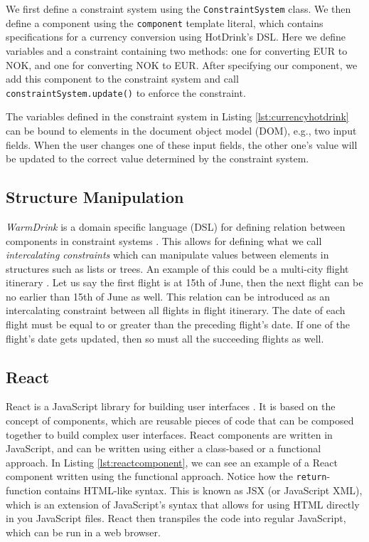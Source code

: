 \documentclass[11pt, a4paper]{article}
\begin{document}
We first define a constraint system using the \texttt{ConstraintSystem} class. We then define a component using the \texttt{component} template literal, which contains specifications for a currency conversion using HotDrink's DSL. Here we define variables and a constraint containing two methods: one for converting EUR to NOK, and one for converting NOK to EUR. After specifying our component, we add this component to the constraint system and call \texttt{constraintSystem.update()} to enforce the constraint.

The variables defined in the constraint system in Listing \ref{lst:currencyhotdrink} can be bound to elements in the document object model (DOM), e.g., two input fields. When the user changes one of these input fields, the other one's value will be updated to the correct value determined by the constraint system.

\subsection{Structure Manipulation}
\label{sec:structuremanipulation}
\textit{WarmDrink} is a domain specific language (DSL) for defining relation between components in constraint systems \cite{warmdrink}. This allows for defining what we call \textit{intercalating constraints} which can manipulate values between elements in structures such as lists or trees. An example of this could be a multi-city flight itinerary \cite{warmdrink}. Let us say the first flight is at 15th of June, then the next flight can be no earlier than 15th of June as well. This relation can be introduced as an intercalating constraint between all flights in flight itinerary. The date of each flight must be equal to or greater than the preceding flight's date. If one of the flight's date gets updated, then so must all the succeeding flights as well.

\subsection{React}
\label{sec:react}
React is a JavaScript library for building user interfaces \cite{react}. It is based on the concept of components, which are reusable pieces of code that can be composed together to build complex user interfaces. React components are written in JavaScript, and can be written using either a class-based or a functional approach. In Listing \ref{lst:reactcomponent}, we can see an example of a React component written using the functional approach. Notice how the \texttt{return}-function contains HTML-like syntax. This is known as JSX (or JavaScript XML), which is an extension of JavaScript's syntax that allows for using HTML directly in you JavaScript files. React then transpiles the code into regular JavaScript, which can be run in a web browser.
\end{document}
